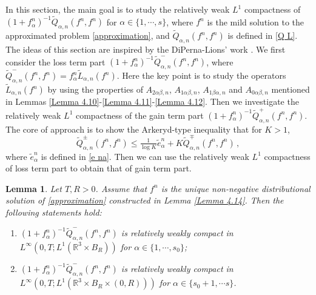 \documentclass[reqno,11pt]{amsart}
\newtheorem{lemma}{Lemma}[section]
\numberwithin{equation}{section}
\def\R{\mathbb{R}}
\begin{document}
In this section, the main goal is to study the relatively weak $L^1$ compactness of $(1 + f^n_\alpha)^{-1} \tilde{Q}_{\alpha, n} (f^n, f^n)$ for $\alpha \in \{ 1, \cdots, s \}$, where $f^n$ is the mild solution to the approximated problem \eqref{approximation}, and $\tilde{Q}_{\alpha, n} (f^n, f^n)$ is defined in \eqref{Q L}. The ideas of this section are inspired by the DiPerna-Lions' work \cite{Diperna-Lions}. We first consider the loss term part $(1 + f^n_\alpha)^{-1} \tilde{Q}_{\alpha, n}^- (f^n, f^n)$, where $ \tilde{Q}_{\alpha, n}^- (f^n, f^n) = f^n_\alpha \tilde{L}_{\alpha, n} (f^n) $. Here the key point is to study the operators $ \tilde{L}_{\alpha, n} (f^n) $ by using the properties of $A_{2 \alpha \beta, n}$, $A_{1 \alpha \beta, n}$, $A_{1 \beta \alpha, n}$ and $A_{0 \alpha \beta , n}$ mentioned in Lemmas \ref{Lemma 4.10}-\ref{Lemma 4.11}-\ref{Lemma 4.12}. Then we investigate the relatively weak $L^1$ compactness of the gain term part $(1 + f^n_\alpha)^{-1} \tilde{Q}_{\alpha, n}^+ (f^n, f^n)$. The core of approach is to show the Arkeryd-type inequality \cite{Arkeryd-inequality} that for $K > 1$,
\begin{equation}\label{eq5.71}
\tilde{Q}^\pm_{\alpha ,n}(f^n,f^n) \leq \tfrac{1}{\log K}\tilde{e}^n_{\alpha} +K\tilde{Q}^\mp_{\alpha ,n}	(f^n,f^n) \,,
\end{equation}
where $\tilde{e}^n_{\alpha}$ is defined in \eqref{e na}. Then we can use the relatively weak $L^1$ compactness of loss term part to obtain that of gain term part.

\begin{lemma} \label{theo-4.1}
	Let $T, R>0$. Assume that $f^n$ is the unique non-negative distributional solution of \eqref{approximation} constructed in Lemma \ref{Lemma 4.14}. Then the following statements hold:
	\begin{enumerate}
	\item {$ (1+ f^n_\alpha)^{-1} \tilde{Q}^- _{\alpha ,n}(f^n,f^n)$ is
	 relatively weakly compact in $L^\infty (0,T; L^1(\R^3 \times B_R))$ for $\alpha \in \{1,\cdots,s_0\}$;}
	\item {$ (1+ f^n_\alpha)^{-1} \tilde{Q}^- _{\alpha ,n}(f^n,f^n)$ is
 relatively weakly compact in $L^\infty (0,T; L^1(\R^3 \times B_R\times (0,R) ))$ for $\alpha \in \{s_0+1,\cdots s\}$.}
	\end{enumerate}
\end{lemma}
\end{document}
